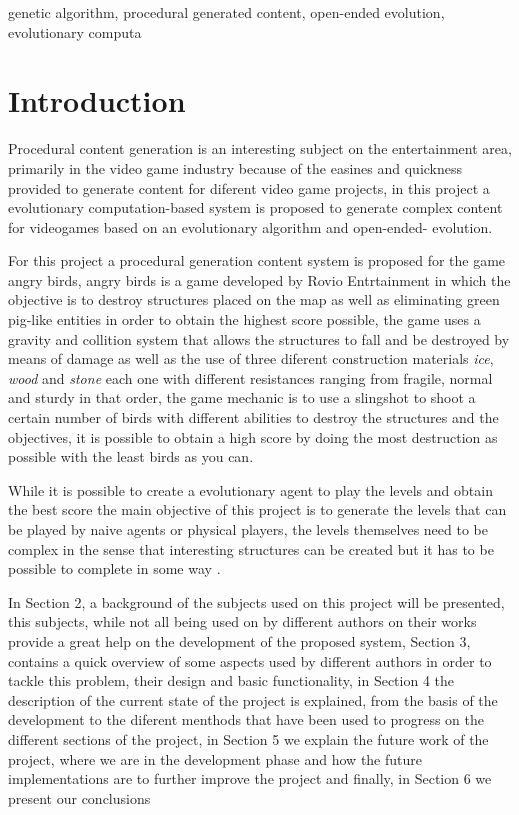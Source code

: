 \documentclass[conference]{IEEEtran}
\begin{document}
\begin{IEEEkeywords}
genetic algorithm, procedural generated content, open-ended evolution,
evolutionary computa
\end{IEEEkeywords}

\section{Introduction}
Procedural content generation is an interesting subject on the entertainment
area, primarily in the video game industry because of the easines and quickness
provided to generate content for diferent video game projects, in this project a
evolutionary computation-based system is proposed to generate complex content
for videogames based on an evolutionary algorithm and open-ended- evolution.

For this project a procedural generation content system is proposed for the game
angry birds, angry birds is a game developed by Rovio Entrtainment in which the
objective is to destroy structures placed on the map as well as eliminating
green pig-like entities in order to obtain the highest score possible, the game
uses a gravity and collition system that allows the structures to fall and be
destroyed by means of damage as well as the use of three diferent construction
materials \textit{ice}, \textit{wood} and \textit{stone} each one with different
resistances ranging from fragile, normal and sturdy in that order, the game
mechanic is to use a slingshot to shoot a certain number of birds with different
abilities to destroy the structures and the objectives, it is possible to obtain
a high score by doing the most destruction as possible with the least birds as
you can. \cite{RovioEntertainmentCorporation2009}

While it is possible to create a evolutionary agent to play the levels and
obtain the best score the main objective of this project is to generate the
levels that can be played by naive agents or physical players, the levels
themselves need to be complex in the sense that interesting structures can be
created but it has to be possible to complete in some way
\cite{Stephenson,Stephenson2018}.

In Section 2, a background of the subjects used on this project will be
presented, this subjects, while not all being used on by different authors on
their works provide a great help on the development of the proposed system,
Section 3, contains a quick overview of some aspects used by different authors
in order to tackle this problem, their design and basic functionality, in
Section 4 the description of the current state of the project is explained, from
the basis of the development to the diferent menthods that have been used to
progress on the different sections of the project, in Section 5 we explain the
future work of the project, where we are in the development phase and how the
future implementations are to further improve the project and finally, in
Section 6 we present our conclusions
 
\end{document}
